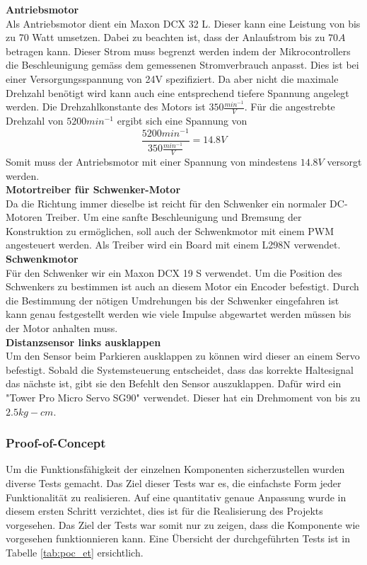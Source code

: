\documentclass[../../main.tex]{subfiles}
\begin{document}
    \textbf{Antriebsmotor}\\
    Als Antriebsmotor dient ein Maxon DCX 32 L. Dieser kann eine Leistung von bis zu 70 Watt umsetzen. Dabei zu beachten ist, dass der Anlaufstrom bis zu $70A$ betragen kann. Dieser Strom muss begrenzt werden indem der Mikrocontrollers die Beschleunigung gemäss dem gemessenen Stromverbrauch anpasst.\cite{MaxonDCX32L} Dies ist bei einer Versorgungsspannung von 24V spezifiziert. Da aber nicht die maximale Drehzahl benötigt wird kann auch eine entsprechend tiefere Spannung angelegt werden. Die Drehzahlkonstante des Motors ist $350 \frac{min^{-1}}{V}$. Für die angestrebte Drehzahl von $5200min^{-1}$ ergibt sich eine Spannung von $$\frac{5200min^{-1}}{350 \frac{min^{-1}}{V}} =14.8V$$ Somit muss der Antriebsmotor mit einer Spannung von mindestens $14.8V$ versorgt werden.\\

    \textbf{Motortreiber für Schwenker-Motor}\\
    Da die Richtung immer dieselbe ist reicht für den Schwenker ein normaler DC-Motoren Treiber. Um eine sanfte Beschleunigung und Bremsung der Konstruktion zu ermöglichen, soll auch der Schwenkmotor mit einem PWM angesteuert werden. Als Treiber wird ein Board mit einem L298N verwendet.\\

    \textbf{Schwenkmotor}\\
    Für den Schwenker wir ein Maxon DCX 19 S verwendet. Um die Position des Schwenkers zu bestimmen ist auch an diesem Motor ein Encoder befestigt. Durch die Bestimmung der nötigen Umdrehungen bis der Schwenker eingefahren ist kann genau festgestellt werden wie viele Impulse abgewartet werden müssen bis der Motor anhalten muss. \cite{MaxonDCX19S}\\

    \textbf{Distanzsensor links ausklappen}\\
    Um den Sensor beim Parkieren ausklappen zu können wird dieser an einem Servo befestigt. Sobald die Systemsteuerung entscheidet, dass das korrekte Haltesignal das nächste ist, gibt sie den Befehlt den Sensor auszuklappen. Dafür wird ein "Tower Pro Micro Servo SG90" verwendet. Dieser hat ein Drehmoment von bis zu $2.5 kg-cm$. \cite{SG90Datasheet}\\

    \subsubsection{Proof-of-Concept}
    Um die Funktionsfähigkeit der einzelnen Komponenten sicherzustellen wurden diverse Tests gemacht. Das Ziel dieser Tests war es, die einfachste Form jeder Funktionalität zu realisieren. Auf eine quantitativ genaue Anpassung wurde in diesem ersten Schritt verzichtet, dies ist für die Realisierung des Projekts vorgesehen. Das Ziel der Tests war somit nur zu zeigen, dass die Komponente wie vorgesehen funktionnieren kann. Eine Übersicht der durchgeführten Tests ist in Tabelle \ref{tab:poc_et} ersichtlich.\\
\end{document}

